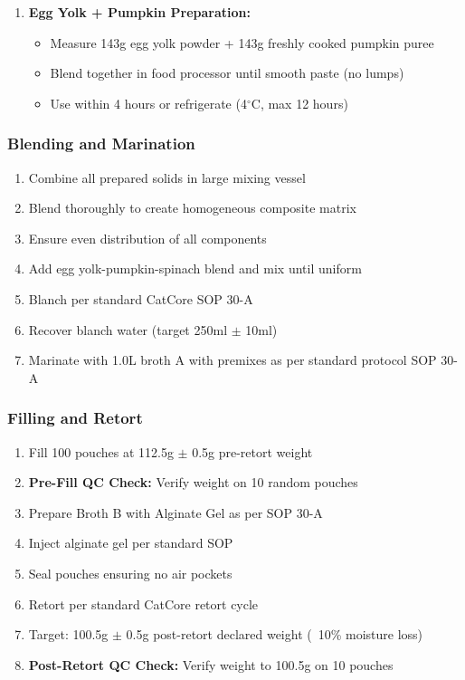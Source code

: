 \begin{enumerate}
\item \textbf{Egg Yolk + Pumpkin Preparation:}
\begin{itemize}
\item Measure 143g egg yolk powder + 143g freshly cooked pumpkin puree
\item Blend together in food processor until smooth paste (no lumps)
\item Use within 4 hours or refrigerate (4$^\circ$C, max 12 hours)
\end{itemize}
\end{enumerate}

\subsubsection*{Blending and Marination}
\begin{enumerate}
\item Combine all prepared solids in large mixing vessel
\item Blend thoroughly to create homogeneous composite matrix
\item Ensure even distribution of all components
\item Add egg yolk-pumpkin-spinach blend and mix until uniform
\item Blanch per standard CatCore SOP 30-A
\item Recover blanch water (target 250ml $\pm$ 10ml)
\item Marinate with 1.0L broth A with premixes as per standard protocol SOP 30-A
\end{enumerate}

\subsubsection*{Filling and Retort}
\begin{enumerate}
\item Fill 100 pouches at 112.5g $\pm$ 0.5g pre-retort weight
\item \textbf{Pre-Fill QC Check:} Verify weight on 10 random pouches
\item Prepare Broth B with Alginate Gel as per SOP 30-A
\item Inject alginate gel per standard SOP
\item Seal pouches ensuring no air pockets
\item Retort per standard CatCore retort cycle
\item Target: 100.5g $\pm$ 0.5g post-retort declared weight (~10\% moisture loss)
\item \textbf{Post-Retort QC Check:} Verify weight to 100.5g on 10 pouches
\end{enumerate}

